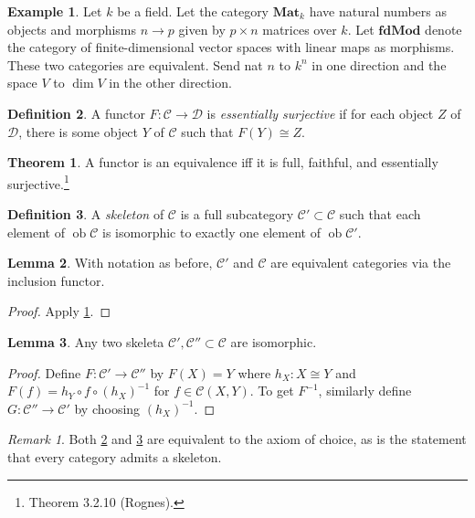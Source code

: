 \documentclass[10pt,letterpaper,cm]{nupset}
\theoremstyle{definition}
\newtheorem{definition}{Definition}
\newtheorem{exmp}[definition]{Example}
\theoremstyle{theorem}
\newtheorem{theorem}{Theorem}
\newtheorem{lemma}[theorem]{Lemma}
\theoremstyle{remark}
\newtheorem{remark}{Remark}
\newcommand{\1}{\mathbf{1}}
\renewcommand{\c}{\mathscr{C}}
\renewcommand{\d}{\mathscr{D}}
\newcommand{\0}{\vec 0}
\DeclareMathOperator{\ob}{ob}
\begin{document}
\begin{exmp}
Let $k$ be a field. Let the category $\mathbf{Mat}_k$  have natural numbers as objects and morphisms $n \to p$ given by $p \times n$ matrices over $k$. Let $\mathbf{fdMod}$ denote the category of finite-dimensional vector spaces with linear maps as morphisms. These two categories are equivalent. Send nat $n$ to $k^n$ in one direction and the space $V$ to $\dim V$ in the other direction.    
\end{exmp}

\begin{definition}
A functor $F : \c \to \d$ is \textit{essentially surjective} if for each object $Z$ of  $\d$, there is some object $Y$ of $\c$ such that $F(Y) \cong Z$.
\end{definition}

\begin{theorem}\label{equiv}
A functor is an equivalence iff it is full, faithful, and essentially surjective.\footnote{Theorem 3.2.10 (Rognes).}
\end{theorem}


\begin{definition}
A \textit{skeleton} of $\c$ is a full subcategory $\c' \subset \c$ such that each element of $\ob \c$ is isomorphic to exactly one element of $\ob \c'$.
\end{definition}

\begin{lemma}\label{e1}
With notation as before, $\c'$ and $\c$ are equivalent categories via the inclusion functor.
\end{lemma}
\begin{proof}
Apply \cref{equiv}.
\end{proof}

\begin{lemma}\label{e2}
Any two skeleta $\c', \c'' \subset \c$ are isomorphic.
\end{lemma}
\begin{proof}
Define $F: \c' \to \c''$ by $F(X) =Y$ where $h_X: X \cong Y$ and $F(f) = h_Y \circ f \circ (h_X)^{{-}1}$ for $f\in \c(X, Y)$. 
To get $F^{{-}1}$, similarly define $G: \c'' \to \c'$ by choosing $(h_X)^{{-}1}$.
\end{proof}

\begin{remark}
Both \cref{e1} and \cref{e2} are equivalent to the axiom of choice, as is the statement that every category admits a skeleton.
\end{remark}
\end{document}
